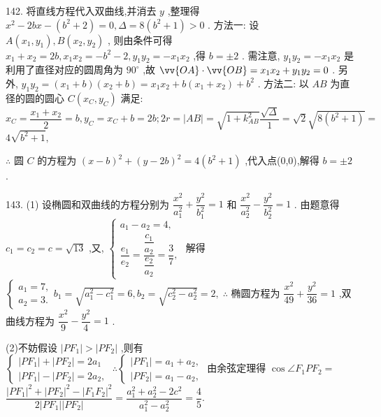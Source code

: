 142. 将直线方程代入双曲线,并消去 $y$ ,整理得 ${x}^{2} - {2bx} - \left( {{b}^{2} + 2}\right)  = 0,\Delta  = 8\left( {{b}^{2} + 1}\right)  > 0$ . 方法一: 设 $A\left( {{x}_{1},{y}_{1}}\right) ,B\left( {{x}_{2},{y}_{2}}\right)$ , 则由条件可得 ${x}_{1} + {x}_{2} = {2b},{x}_{1}{x}_{2} =  - {b}^{2} - 2,{y}_{1}{y}_{2} =  - {x}_{1}{x}_{2}$ ,得 $b =  \pm  2$ . 需注意, ${y}_{1}{y}_{2} =  - {x}_{1}{x}_{2}$ 是利用了直径对应的圆周角为 ${90}^{ \circ  }$ ,故 $\vv{OA} \cdot  \vv{OB} = {x}_{1}{x}_{2} + {y}_{1}{y}_{2} = 0$ . 另外, ${y}_{1}{y}_{2} = \left( {{x}_{1} + b}\right) \left( {{x}_{2} + b}\right)  = {x}_{1}{x}_{2} + b\left( {{x}_{1} + {x}_{2}}\right)  + {b}^{2}$ . 方法二: 以 ${AB}$ 为直径的圆的圆心 $C\left( {{x}_{C},{y}_{C}}\right)$ 满足: ${x}_{C} = \dfrac{{x}_{1} + {x}_{2}}{2} = b,{y}_{C} = {x}_{C} + b = {2b};{2r} = \left| {AB}\right|  = \sqrt{1 + {k}_{AB}^{2}}\dfrac{\sqrt{\Delta }}{1} = \sqrt{2}\sqrt{8\left( {{b}^{2} + 1}\right) } =$  $4\sqrt{{b}^{2} + 1},$

$\therefore$ 圆 $C$ 的方程为 ${\left( x - b\right) }^{2} + {\left( y - 2b\right) }^{2} = 4\left( {{b}^{2} + 1}\right)$ ,代入点(0,0),解得 $b =  \pm  2$ .

143. (1) 设椭圆和双曲线的方程分别为 $\dfrac{{x}^{2}}{{a}_{1}^{2}} + \dfrac{{y}^{2}}{{b}_{1}^{2}} = 1$ 和 $\dfrac{{x}^{2}}{{a}_{2}^{2}} - \dfrac{{y}^{2}}{{b}_{2}^{2}} = 1$ . 由题意得 ${c}_{1} = {c}_{2} = c = \sqrt{13}$ ,又, $\left\{  \begin{array}{l} {a}_{1} - {a}_{2} = 4, \\  \dfrac{{e}_{1}}{{e}_{2}} = \dfrac{\dfrac{{c}_{1}}{{a}_{2}}}{\dfrac{{e}_{2}}{{a}_{2}}} = \dfrac{3}{7}, \end{array}\right.$ 解得 $\left\{  {\begin{array}{l} {a}_{1} = 7, \\  {a}_{2} = 3. \end{array}{b}_{1} = \sqrt{{a}_{1}^{2} - {c}_{1}^{2}} = 6,{b}_{2} = \sqrt{{c}_{2}^{2} - {a}_{2}^{2}} = 2,\;\therefore }\right.$ 椭圆方程为 $\dfrac{{x}^{2}}{49} + \dfrac{{y}^{2}}{36} = 1$ ,双曲线方程为 $\dfrac{{x}^{2}}{9} - \dfrac{{y}^{2}}{4} = 1$ .

(2)不妨假设 $\left| {P{F}_{1}}\right|  > \left| {P{F}_{2}}\right|$ ,则有 $\left\{  {\begin{array}{l} \left| {P{F}_{1}}\right|  + \left| {P{F}_{2}}\right|  = 2{a}_{1} \\  \left| {P{F}_{1}}\right|  - \left| {P{F}_{2}}\right|  = 2{a}_{2}, \end{array}\;\therefore \left\{  {\begin{array}{l} \left| {P{F}_{1}}\right|  = {a}_{1} + {a}_{2}, \\  \left| {P{F}_{2}}\right|  = {a}_{1} - {a}_{2}, \end{array}\text{ 由余弦定理得 }\cos \angle {F}_{1}P{F}_{2} = }\right. }\right.$  $\dfrac{{\left| P{F}_{1}\right| }^{2} + {\left| P{F}_{2}\right| }^{2} - {\left| {F}_{1}{F}_{2}\right| }^{2}}{2\left| {P{F}_{1}}\right| \left| {P{F}_{2}}\right| } = \dfrac{{a}_{1}^{2} + {a}_{2}^{2} - 2{c}^{2}}{{a}_{1}^{2} - {a}_{2}^{2}} = \dfrac{4}{5}.$

